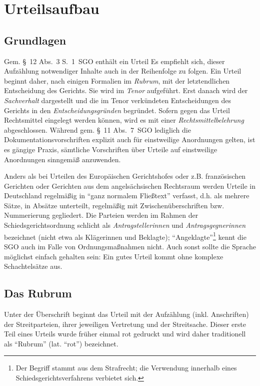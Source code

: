 
\chapter{Urteilsaufbau}

\section{Grundlagen}
Gem. \S~12 Abs.~3 S.~1~SGO enthält ein Urteil 
Es empfiehlt sich, dieser Aufzählung notwendiger Inhalte auch in der Reihenfolge zu folgen.
Ein Urteil beginnt daher, nach einigen Formalien im \emph{Rubrum}, mit der letztendlichen Entscheidung des Gerichts.
Sie wird im \emph{Tenor} aufgeführt.
Erst danach wird der \emph{Sachverhalt} dargestellt und die im Tenor verkündeten Entscheidungen des Gerichts in den \emph{Entscheidungsgründen} begründet.
Sofern gegen das Urteil Rechtsmittel eingelegt werden können, wird es mit einer \emph{Rechtsmittelbelehrung} abgeschlossen.
Während gem. \S~11 Abs.~7~SGO lediglich die Dokumentationsvorschriften explizit auch für einstweilige Anordnungen gelten, ist es gängige Praxis, sämtliche Vorschriften über Urteile auf einstweilige Anordnungen sinngemäß anzuwenden.

Anders als bei Urteilen des Europäischen Gerichtshofes oder z.B. französischen Gerichten oder Gerichten aus dem angelsächsischen Rechtsraum werden Urteile in Deutschland regelmäßig in \enquote{ganz normalem Fließtext} verfasst, d.h. als mehrere Sätze, in Absätze unterteilt, regelmäßig mit Zwischenüberschriften bzw. Nummerierung gegliedert.
Die Parteien werden im Rahmen der Schiedsgerichtsordnung schlicht als \emph{Antragstellerinnen} und \emph{Antragsgegnerinnen} bezeichnet (nicht etwa als Klägerinnen und Beklagte); \enquote{Angeklagte}\footnote{Der Begriff stammt aus dem Strafrecht; die Verwendung innerhalb eines Schiedsgerichtsverfahrens verbietet sich.} kennt die SGO auch im Falle von Ordnungsmaßnahmen nicht.
Auch sonst sollte die Sprache möglichst einfach gehalten sein:
Ein gutes Urteil kommt ohne komplexe Schachtelsätze aus.

\section{Das Rubrum}
Unter der Überschrift  beginnt das Urteil mit der Aufzählung (inkl. Anschriften) der Streitparteien, ihrer jeweiligen Vertretung und der Streitsache.
Dieser erste Teil eines Urteils wurde früher einmal rot gedruckt und wird daher traditionell als \enquote{Rubrum} (lat. \enquote{rot}) bezeichnet.

